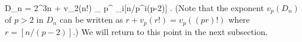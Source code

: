 \be
\label{Dn}
D_n = 2^{3n + v_2(n!)} \prod_{}
 p^{ \sum_{i}[n/p^i(p-2)]} .
\ee
(Note that the exponent $v_p(D_n)$ of $p >2$ in $D_n$ can be written
as $r+v_p(r!) = v_p((p r)!)$ where $r=[n/(p-2)]$.) We will
return to this point in the next subsection.
